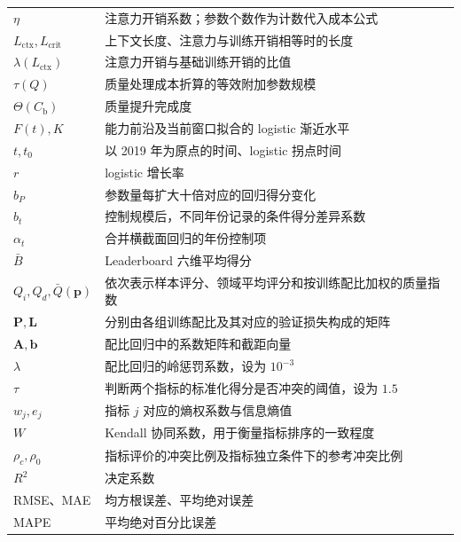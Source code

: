 \begin{longtable}{@{}>{\centering\arraybackslash}p{}>{\raggedright\arraybackslash}p{}@{}}
$\eta$ & 注意力开销系数；参数个数作为计数代入成本公式\\
$L_{\text{ctx}},L_{\text{crit}}$ & 上下文长度、注意力与训练开销相等时的长度\\
$\lambda(L_{\text{ctx}})$ & 注意力开销与基础训练开销的比值\\
$\tau(Q)$ & 质量处理成本折算的等效附加参数规模\\
$\Theta(C_{\mathrm b})$ & 质量提升完成度\\
$F(t),K$ & 能力前沿及当前窗口拟合的 logistic 渐近水平\\
$t,t_0$ & 以 2019 年为原点的时间、logistic 拐点时间\\
$r$ & logistic 增长率\\
$b_P$ & 参数量每扩大十倍对应的回归得分变化\\
$b_t$ & 控制规模后，不同年份记录的条件得分差异系数\\
$\alpha_t$ & 合并横截面回归的年份控制项\\
$\bar B$ & Leaderboard 六维平均得分\\
$Q_i,Q_d,\bar Q(\bm p)$ & 依次表示样本评分、领域平均评分和按训练配比加权的质量指数\\
$\bm P,\bm L$ & 分别由各组训练配比及其对应的验证损失构成的矩阵\\
$\bm A,\bm b$ & 配比回归中的系数矩阵和截距向量\\
$\lambda$ & 配比回归的岭惩罚系数，设为 $10^{-3}$\\
$\tau$ & 判断两个指标的标准化得分是否冲突的阈值，设为 $1.5$\\
$w_j,e_j$ & 指标 $j$ 对应的熵权系数与信息熵值\\
$W$ & Kendall 协同系数，用于衡量指标排序的一致程度\\
$\rho_c,\rho_0$ & 指标评价的冲突比例及指标独立条件下的参考冲突比例\\
$R^2$ & 决定系数\\
RMSE、MAE & 均方根误差、平均绝对误差\\
MAPE & 平均绝对百分比误差\\
\end{longtable}
\endgroup
